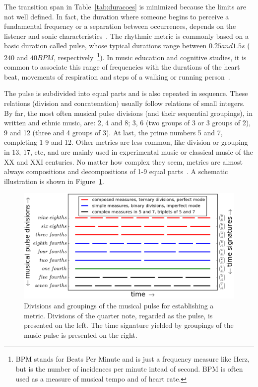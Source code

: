 The transition span in Table~\ref{tab:duracoes} is minimized because the limits
are not well defined. In fact, the duration where someone begins to perceive a
fundamental frequency or a separation between occurrences, depends on the
listener and sonic characteristics~\cite{microsound,Roederer}. The rhythmic metric is commonly based on a basic duration called pulse, whose typical durations range between $0.25 and 1.5s$ ($240$
and $40 BPM$, respectively~\footnote{BPM stands for Beats Per Minute and is just a frequency measure like Herz, but is the number of incidences per minute intead of second. BPM is often used as a measure of musical tempo and of heart rate.}). In music education and cognitive studies, it is common to associate this range of frequencies with the durations of the heart beat, movements of respiration and steps of a walking or running person~\cite{Lacerda,Roederer}.

The pulse is subdivided into equal parts and is also repeated in sequence. These relations (division and concatenation) usually follow relations of small
integers. By far, the most often musical pulse divisions (and their sequential groupings), in written and ethnic
music, are: 2, 4 and 8; 3, 6 (two groups of 3 or 3 groups of 2), 9 and 12 (three and 4 groups of 3). At last, the prime numbers 5 and 7, completing
1-9 and 12. Other metrics are less common, like division or grouping in 13, 17, etc, and are mainly used in experimental music or classical music of the XX and XXI centuries. No matter how complex they seem, metrics are almost always compositions and decompositions of 1-9 equal parts~\cite{Gramani,Roederer}.
A schematic illustration is shown in Figure~\ref{fig:pulsoSubAgl}.

\begin{figure}
    \centering
        \includegraphics[width=.9\textwidth]{figures/metricaMusical__}
    \caption{Divisions and groupings of the musical pulse for establishing a metric. Divisions of the quarter note, regarded as the
        pulse, is presented on the left. The time signature yielded by
        groupings of the music pulse is presented on the right.}
        \label{fig:pulsoSubAgl}
\end{figure}

